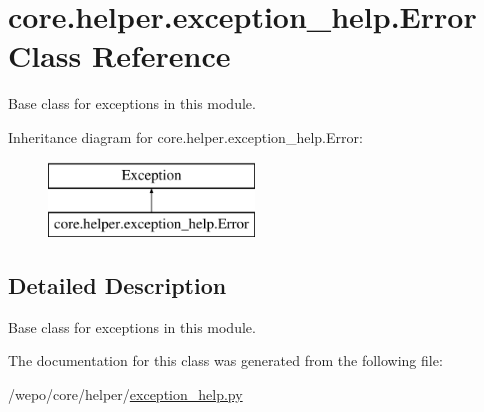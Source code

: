 \hypertarget{classcore_1_1helper_1_1exception__help_1_1Error}{\section{core.\-helper.\-exception\-\_\-help.\-Error Class Reference}
\label{classcore_1_1helper_1_1exception__help_1_1Error}
}


Base class for exceptions in this module.  


Inheritance diagram for core.\-helper.\-exception\-\_\-help.\-Error\-:\begin{figure}[H]
\begin{center}
\leavevmode
\includegraphics[height=2.000000cm]{classcore_1_1helper_1_1exception__help_1_1Error}
\end{center}
\end{figure}


\subsection{Detailed Description}
Base class for exceptions in this module. 

The documentation for this class was generated from the following file\-:\begin{DoxyCompactItemize}
\item 
/wepo/core/helper/\hyperlink{exception__help_8py}{exception\-\_\-help.\-py}\end{DoxyCompactItemize}
